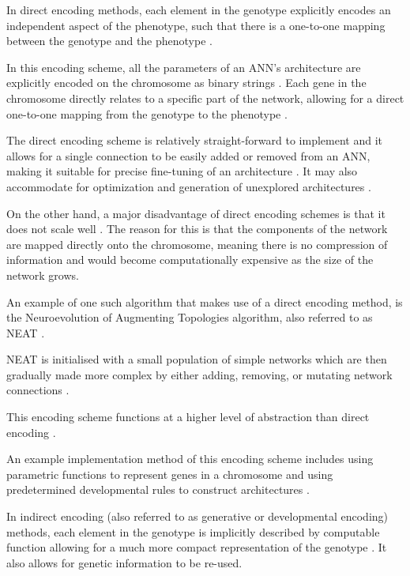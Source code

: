 
In direct encoding methods, each element in the genotype explicitly encodes an independent aspect of the phenotype, such that there is a one-to-one mapping between the genotype and the phenotype \cite{clune2011performance,stanley2009hypercube}.

In this encoding scheme, all the parameters of an ANN's architecture are explicitly encoded on the chromosome as binary strings \cite{Gomez2003}. Each gene in the chromosome directly relates to a specific part of the network, allowing for a direct one-to-one mapping from the genotype to the phenotype \cite{StanleyMiikkulainen2002}.

The direct encoding scheme is relatively straight-forward to implement and it allows for a single connection to be easily added or removed from an ANN, making it suitable for precise fine-tuning of an architecture \cite{StanleyMiikkulainen2002}.
It may also accommodate for optimization and generation of unexplored architectures \cite{miller1989designing}.

On the other hand, a major disadvantage of direct encoding schemes is that it does not scale well \cite{XinYao1999}.  The reason for this is that the components of the network are mapped directly onto the chromosome, meaning there is no compression of information and would become computationally expensive as the size of the network grows.

An example of one such algorithm that makes use of a direct encoding method, is the Neuroevolution of Augmenting Topologies algorithm, also referred to as NEAT \cite{Gomez2003}.

NEAT is initialised with a small population of simple networks which are then gradually made more complex by either adding, removing, or mutating network connections \cite{RefWorks:11,Gomez2003}.



This encoding scheme functions at a higher level of abstraction than direct encoding  \cite{Gomez2003}.

An example implementation method of this encoding scheme includes using parametric functions to represent genes in a chromosome and using predetermined developmental rules to construct architectures \cite{koutnik2010evolving}.

In indirect encoding (also referred to as generative or developmental encoding) methods, each element in the genotype is implicitly described by computable function allowing for a much more compact representation of the genotype \cite{clune2011performance,stanley2009hypercube}. It also allows for genetic information to be re-used.

